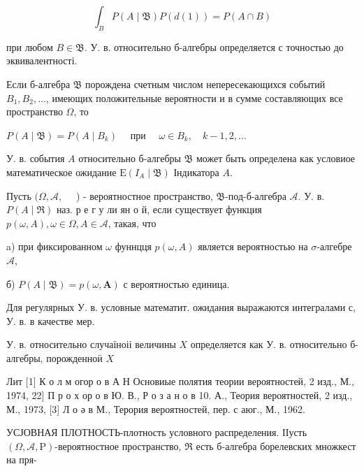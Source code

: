 \documentclass[10pt]{article}
\begin{document}
\[

\int_{B} P(A \mid \mathfrak{B}) P(d(1))=P(A \cap B)

\]



при любом $B \in \mathfrak{B}$. У. в. относительно б-алгебры определяется с точностью до эквивалентності.



Если б-алгебра $\mathfrak{B}$ порождена счетным числом непересекающихся событий $B_{1}, B_{2}, \ldots$, имеющих положительные вероятности и в сумме составляющих все пространство $\Omega$, то



$P(A \mid \mathfrak{B})=P\left(A \mid B_{k}\right) \quad$ при $\quad \omega \in B_{k}, \quad k-1,2, \ldots$



У. в. события $A$ относительно б-алгебры $\mathfrak{B}$ может быть определена как условиое математическое ожидание $\mathrm{E}\left(I_{A} \mid \mathfrak{B}\right)$ Індикатора $A$.



Пусть $(\Omega, \mathcal{A}, \quad$ ) - вероятностное пространство, $\mathfrak{B}$-под-б-алгебра $\mathcal{A}$. У. в. $P(A \mid \Re)$ наз. р е г у ли ян о й, если существует функция $p(\omega, A), \omega \in \Omega, A \in \mathcal{A}$, такая, что



a) при фиксированном $\omega$ фуннцця $p(\omega, A)$ является вероятностью на $\sigma$-алгебре $\mathscr{A}$,



б) $P(A \mid \mathfrak{B})=p(\omega, \boldsymbol{A})$ с вероятностью единица.



Для регулярных У. в. условные математит. ожидания выражаются интегралами с, У. в. в качестве мер.



У. в. относительно случаїноіі величины $X$ определяется как У. в. относительно б-алгебры, порожденноӥ $X$



Лит [1] К о л м огор о в А Н Основиые полятия теории вероятностей, 2 изд., М., 1974, 22$]$ П р о х ор о в Ю. В., Р о з а н о в 10. А., Теория вероятностей, 2 изд., М., 1973, [3] Л о ә в М., Терория вероятностей, пер. с аюг., М., 1962.



УСЈОВНАЯ ПЛОТНОСТЬ-плотность условного распределения. ІІусть $(\Omega, \mathcal{A}, \mathrm{P})$-вероятностное пространство, $\Re$ есть б-алгебра борелевских множкест на пря-
\end{document}
